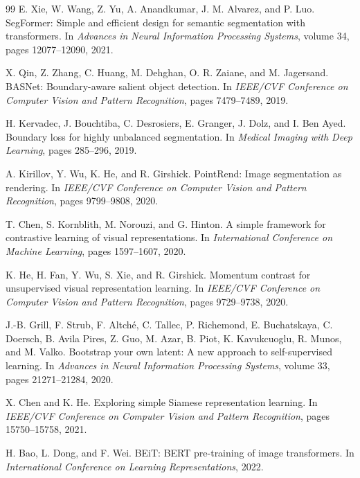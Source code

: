 \documentclass[11pt]{article}
\begin{document}
\begin{thebibliography}{99}
E. Xie, W. Wang, Z. Yu, A. Anandkumar, J. M. Alvarez, and P. Luo.
\newblock SegFormer: Simple and efficient design for semantic segmentation with transformers.
\newblock In \emph{Advances in Neural Information Processing Systems}, volume 34, pages 12077--12090, 2021.

X. Qin, Z. Zhang, C. Huang, M. Dehghan, O. R. Zaiane, and M. Jagersand.
\newblock BASNet: Boundary-aware salient object detection.
\newblock In \emph{IEEE/CVF Conference on Computer Vision and Pattern Recognition}, pages 7479--7489, 2019.

H. Kervadec, J. Bouchtiba, C. Desrosiers, E. Granger, J. Dolz, and I. Ben Ayed.
\newblock Boundary loss for highly unbalanced segmentation.
\newblock In \emph{Medical Imaging with Deep Learning}, pages 285--296, 2019.

A. Kirillov, Y. Wu, K. He, and R. Girshick.
\newblock PointRend: Image segmentation as rendering.
\newblock In \emph{IEEE/CVF Conference on Computer Vision and Pattern Recognition}, pages 9799--9808, 2020.

T. Chen, S. Kornblith, M. Norouzi, and G. Hinton.
\newblock A simple framework for contrastive learning of visual representations.
\newblock In \emph{International Conference on Machine Learning}, pages 1597--1607, 2020.

K. He, H. Fan, Y. Wu, S. Xie, and R. Girshick.
\newblock Momentum contrast for unsupervised visual representation learning.
\newblock In \emph{IEEE/CVF Conference on Computer Vision and Pattern Recognition}, pages 9729--9738, 2020.

J.-B. Grill, F. Strub, F. Altch{\'e}, C. Tallec, P. Richemond, E. Buchatskaya, C. Doersch, B. Avila Pires, Z. Guo, M. Azar, B. Piot, K. Kavukcuoglu, R. Munos, and M. Valko.
\newblock Bootstrap your own latent: A new approach to self-supervised learning.
\newblock In \emph{Advances in Neural Information Processing Systems}, volume 33, pages 21271--21284, 2020.

X. Chen and K. He.
\newblock Exploring simple Siamese representation learning.
\newblock In \emph{IEEE/CVF Conference on Computer Vision and Pattern Recognition}, pages 15750--15758, 2021.

H. Bao, L. Dong, and F. Wei.
\newblock BEiT: BERT pre-training of image transformers.
\newblock In \emph{International Conference on Learning Representations}, 2022.


\end{thebibliography}
\end{document}
